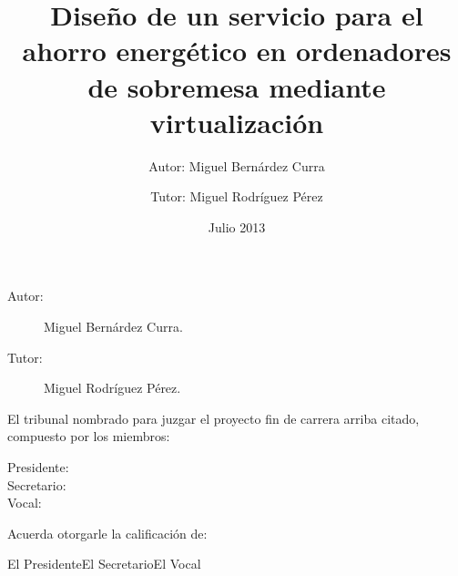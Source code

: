 \documentclass[spanisheDIVcalc,twoside,parskip-,pointlessnumbers,final]{scrbook}
\begin{document}
\title{Diseño de un servicio para el ahorro energético en ordenadores de
sobremesa mediante virtualización}


\author{Autor: Miguel Bernárdez Curra\and Tutor: Miguel Rodríguez Pérez}


\date{Julio 2013}
\maketitle
\newpage{}
\section*{}

\subsection*{}

\begin{description}

\item [{Autor:}] Miguel Bernárdez Curra.
\item [{Tutor:}] Miguel Rodríguez Pérez.
\end{description}

El tribunal nombrado para juzgar el proyecto fin de carrera arriba citado, compuesto por los miembros:
\begin{description}
\item [{Presidente:}] 
\item [{Secretario:}] 
\item [{Vocal:}]
\end{description}

\vspace{1 cm}
\centerline{Acuerda otorgarle la calificación de:}

\vspace{1.5 cm}

\centerline{El Presidente\hspace{3 cm}El Secretario\hspace{3 cm}El Vocal}

\vspace{2.5 cm}
\end{document}
